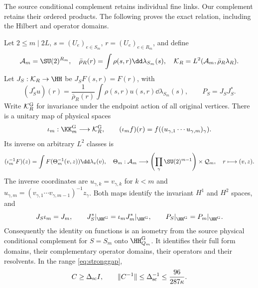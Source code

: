 The source conditional complement retains individual fine links.
Our complement retains their ordered products. The following proves
the exact relation, including the Hilbert and operator domains.

\begin{proposition}\label{prop:physicalbridge}
Let $2\leq m\mid2L$, $s=(U_e)_{e\in S_m}$,
$r=(U_e)_{e\in R_m}$, and define
\[
 \mathcal A_m=\SU(2)^{R_m},\quad
 \bar\rho_R(r)=\int\rho(s,r)\dd\lambda_{S_m}(s),\quad
 \mathcal K_R=L^2(\mathcal A_m,\bar\rho_R\lambda_R).
\]
Let $J_S:\mathcal K_R\to\HH$ be $J_SF(s,r)=F(r)$, with
\[
 (J_S^*u)(r)=\frac{1}{\bar\rho_R(r)}
                \int\rho(s,r)u(s,r)\dd\lambda_{S_m}(s),
 \qquad P_S=J_SJ_S^*.
\]
Write $\mathcal K_R^{\rm G}$ for invariance under the endpoint action
of all original vertices. There is a unitary map of physical spaces
\begin{equation}\label{eq:skeletonunitary}
 \iota_m:\KK_m^{\rm G}\longrightarrow\mathcal K_R^{\rm G},
 \qquad (\iota_m f)(r)=f((u_{\gamma,1}\cdots u_{\gamma,m})_\gamma).
\end{equation}
Its inverse on arbitrary $L^2$ classes is
\begin{equation}\label{eq:skeletoninverse}
 (\iota_m^{-1}F)(z)=\int F(\Theta_m^{-1}(v,z))\dd\lambda_v(v),
 \quad
 \Theta_m:\mathcal A_m\longrightarrow
 \left(\prod_\gamma\SU(2)^{m-1}\right)\times\mathcal Q_m,
 \quad r\longmapsto(v,z).
\end{equation}
The inverse coordinates are $u_{\gamma,k}=v_{\gamma,k}$ for $k<m$
and $u_{\gamma,m}=(v_{\gamma,1}\cdots v_{\gamma,m-1})^{-1}z_\gamma$.
Both maps identify the invariant $H^1$ and $H^2$ spaces, and
\begin{equation}\label{eq:physicalprojections}
 J_S\iota_m=J_m,
 \qquad J_S^*|_{\HH^{\rm G}}=\iota_mJ_m^*|_{\HH^{\rm G}},
 \qquad P_S|_{\HH^{\rm G}}=P_m|_{\HH^{\rm G}}.
\end{equation}
Consequently the identity on functions is an isometry from the
source physical conditional complement for $S=S_m$ onto
$\HH_{Q_m}^{\rm G}$. It identifies their full form domains,
their complementary operator domains, their operators and their
resolvents. In the range \eqref{eq:stronggap},
\begin{equation}\label{eq:uniformC}
 C\geq\Delta_{\rm sc} I,\qquad
 \|C^{-1}\|\leq\Delta_{\rm sc}^{-1}
                  \leq\frac{96}{287\kappa}.
\end{equation}
\end{proposition}

